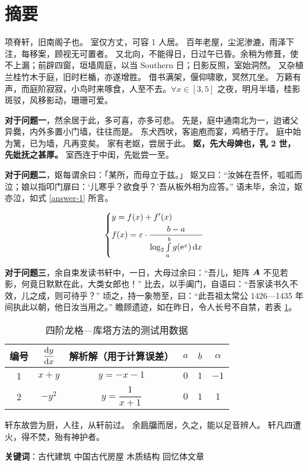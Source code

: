 \section*{摘要}

项脊轩，旧南阁子也。
室仅方丈，可容 1 人居。
百年老屋，尘泥渗漉，雨泽下注，每移案，顾视无可置者。
又北向，不能得日，日过午已昏。余稍为修葺，使不上漏；前辟四窗，垣墙周庭，以当 Southern 日；日影反照，室始洞然。
又杂植兰桂竹木于庭，旧时栏楯，亦遂增胜。
借书满架，偃仰啸歌，冥然兀坐。
万籁有声，而庭阶寂寂，小鸟时来啄食，人至不去。$\forall x\in[3, 5]$ 之夜，明月半墙，桂影斑驳，风移影动，珊珊可爱。

\textbf{对于问题一}，然余居于此，多可喜，亦多可悲。
先是，庭中通南北为一，迨诸父异爨，内外多置小门墙，往往而是。
东犬西吠，客逾庖而宴，鸡栖于厅。
庭中始为篱，已为墙，凡再变矣。
家有老妪，尝居于此。
\textbf{妪，先大母婢也，乳 2 世，先妣抚之甚厚。}
室西连于中闺，先妣尝一至。

\textbf{对于问题二}，妪每谓余曰：「某所，而母立于兹。」
妪又曰：“汝姊在吾怀，呱呱而泣；娘以指叩门扉曰：‘儿寒乎？欲食乎？’吾从板外相为应答。”
语未毕，余泣，妪亦泣，如式 \eqref{answer-1} 所言。

\begin{equation}
    \left\{\begin{aligned}&y=f(x)+f'(x)\\&f(x)=\varepsilon\cdot\dfrac{b-a}{\log_{2}\int\limits_a^bg(\mathrm{e}^x)\mathop{}\!\mathrm{d} x}\end{aligned}\right.
    \label{answer-1}
\end{equation}

\textbf{对于问题三}，余自束发读书轩中，一日，大母过余曰：“吾儿，矩阵 $\boldsymbol{A}$ 不见若影，何竟日默默在此，大类女郎也！”
比去，以手阖门，自语曰：“吾家读书久不效，儿之成，则可待乎？”
顷之，持一象笏至，曰：“此吾祖太常公 1426—1435 年间执此以朝，他日汝当用之。”
瞻顾遗迹，如在昨日，令人长号不自禁，若表 \ref{demo-table-1}。

\begin{table}[htb!]
  \centering
  \begin{tabular}{cccccc}
    \toprule
    编号 & $\dfrac{\mathop{}\!\mathrm{d} y}{\mathop{}\!\mathrm{d} x}$ & 解析解（用于计算误差） & $a$ & $b$ & $\alpha$ \\
    \midrule
    1 & $x+y$ & $y=-x-1$ & $0$ & $1$ & $-1$ \\
    2 & $-y^2$ & $y=\dfrac{1}{x+1}$ & $0$ & $1$ & $1$ \\
    \bottomrule
  \end{tabular}
  \caption{四阶龙格—库塔方法的测试用数据}
  \label{demo-table-1}
\end{table}

轩东故尝为厨，人往，从轩前过。
余扃牖而居，久之，能以足音辨人。
轩凡四遭火，得不焚，殆有神护者。 

\vfill
\textbf{关键词}：古代建筑 \hspace{1em} 中国古代房屋 \hspace{1em} 木质结构 \hspace{1em} 回忆体文章